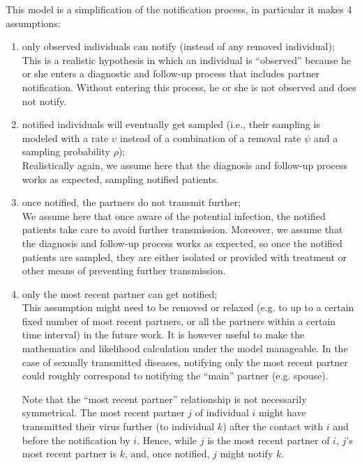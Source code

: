 \documentclass[a4paper,10pt]{article}
\begin{document}
This model is a simplification of the notification process, in particular it makes 4 assumptions:
\begin{enumerate}
\item only observed individuals can notify (instead of any removed individual);\\

This is a realistic hypothesis in which an individual is ``observed'' because he or she enters a diagnostic and follow-up process that includes partner notification. Without entering this process, he or she is not observed and does not notify.

\item notified individuals will eventually get sampled (i.e., their sampling is modeled with a rate $\upsilon$ instead of a combination of a removal rate $\psi$ and a sampling probability $\rho$);\\

Realistically again, we assume here that the diagnosis and follow-up process works as expected, sampling notified patients.

\item once notified, the partners do not transmit further;\\

We assume here that once aware of the potential infection, the notified patients take care to avoid further transmission. Moreover, we assume that the diagnosis and follow-up process works as expected, so once the notified patients are sampled, they are either isolated or provided with treatment or other means of preventing further transmission.

\item only the most recent partner can get notified;\\

This assumption might need to be removed or relaxed (e.g. to up to a certain fixed number of most recent partners, or all the partners within a certain time interval) in the future work. It is however useful to make the mathematics and likelihood calculation under the model manageable. In the case of sexually transmitted diseases, notifying only the most recent partner could roughly correspond to notifying the ``main'' partner (e.g. spouse).

Note that the ``most recent partner'' relationship is not necessarily symmetrical. The most recent partner $j$ of individual $i$ might have transmitted their virus further (to individual $k$) after the contact with $i$ and before the notification by $i$. Hence, while $j$ is the most recent partner of $i$, $j$'s most recent partner is $k$, and, once notified, $j$ might notify $k$.  
\end{enumerate}
\end{document}
